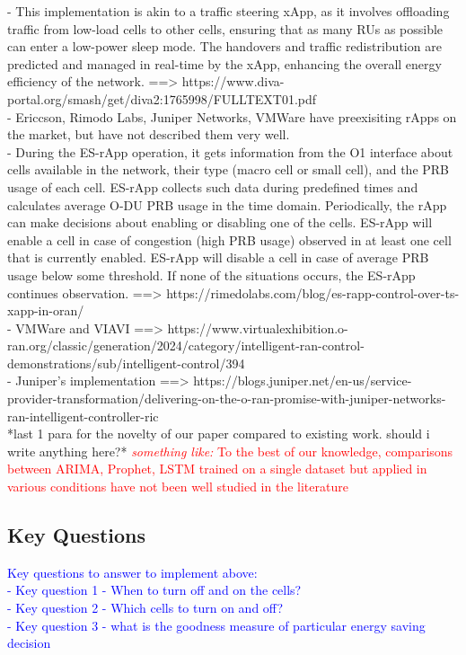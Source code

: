 \documentclass[conference]{IEEEtran}
\begin{document}
- This implementation is akin to a traffic steering xApp, as it involves offloading traffic from low-load cells to other cells, ensuring that as many RUs as possible can enter a low-power sleep mode. The handovers and traffic redistribution are predicted and managed in real-time by the xApp, enhancing the overall energy efficiency of the network. ==> https://www.diva-portal.org/smash/get/diva2:1765998/FULLTEXT01.pdf \\

- Ericcson, Rimodo Labs, Juniper Networks, VMWare have preexisiting rApps on the market, but have not described them very well. \\

- During the ES-rApp operation, it gets information from the O1 interface about cells available in the network, their type (macro cell or small cell), and the PRB usage of each cell. ES-rApp collects such data during predefined times and calculates average O-DU PRB usage in the time domain. Periodically, the rApp can make decisions about enabling or disabling one of the cells. ES-rApp will enable a cell in case of congestion (high PRB usage) observed in at least one cell that is currently enabled. ES-rApp will disable a cell in case of average PRB usage below some threshold. If none of the situations occurs, the ES-rApp continues observation. ==> https://rimedolabs.com/blog/es-rapp-control-over-ts-xapp-in-oran/ \\

- VMWare and VIAVI ==> https://www.virtualexhibition.o-ran.org/classic/generation/2024/category/intelligent-ran-control-demonstrations/sub/intelligent-control/394 \\

- Juniper's implementation ==> https://blogs.juniper.net/en-us/service-provider-transformation/delivering-on-the-o-ran-promise-with-juniper-networks-ran-intelligent-controller-ric \\

*last 1 para for the novelty of our paper compared to existing work. should i write anything here?* \textcolor{red}{\textit{something like: } To the best of our knowledge, comparisons between ARIMA, Prophet, LSTM trained on a single dataset but applied in various conditions have not been well studied in the literature}

\subsection{Key Questions}
\textcolor{blue}{
Key questions to answer to implement above: \\
- Key question 1 - When to turn off and on the cells? \\
- Key question 2 - Which cells to turn on and off? \\
- Key question 3 - what is the goodness measure of particular energy saving decision \\
\\
}
\end{document}
